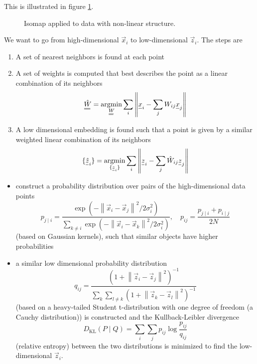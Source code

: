This is illustrated in figure \ref{fig:isomap}.

\begin{figure}[!htb]
    \centering
    
    \caption{Isomap applied to data with non-linear structure.}
    \label{fig:isomap}
\end{figure}

We want to go from high-dimensional $\vec{x}_i$ to low-dimensional $\vec{z}_i$. The steps are
\begin{enumerate}
    \item A set of nearest neighbors is found at each point
    \item A set of weights is computed that best describes the point as a linear combination of its neighbors
    \begin{equation}
        \mat{\hat{W}} = \argmin_\mat{W} \sum_i \norm{\vec{x}_i-\sum_{j}W_{ij}\vec{x}_j}
    \end{equation}
    \item A low dimensional embedding is found such that a point is given by a similar weighted linear combination of its neighbors
    \begin{equation}
        \{ \vec{\hat{z}}_i \} = \argmin_{\{ \vec{z}_i \}} \sum_i \norm{\vec{z}_i-\sum_{j}\hat{W}_{ij}\vec{z}_j}
    \end{equation}
\end{enumerate}

\begin{itemize}
    \item construct a probability distribution over pairs of the high-dimensional data points
    \begin{equation}
        p_{j \mid i}=\frac{\exp \left(-\left\|\vec{x}_i-\vec{x}_j\right\|^2 / 2 \sigma_i^2\right)}{\sum_{k \neq i} \exp \left(-\left\|\vec{x}_i-\vec{x}_k\right\|^2 / 2 \sigma_i^2\right)}, \quad p_{i j}=\frac{p_{j \mid i}+p_{i \mid j}}{2 N}
    \end{equation}
    (based on Gaussian kernels), such that similar objects have higher probabilities
    \item a similar low dimensional probability distribution
    \begin{equation}
        q_{i j}=\frac{\left(1+\left\|\vec{z}_i-\vec{z}_j\right\|^2\right)^{-1}}{\sum_k \sum_{l \neq k}\left(1+\left\|\vec{z}_k-\vec{z}_l\right\|^2\right)^{-1}}
    \end{equation}
    (based on a heavy-tailed Student t-distribution with
    one degree of freedom (a Cauchy distribution)) is constructed
    and the Kullback-Leibler divergence
    \begin{equation}
        D_\text{KL}(P \mid Q)=\sum_{i} \sum_{j} p_{i j} \log \frac{p_{i j}}{q_{i j}}
    \end{equation}
    (relative entropy) between the two distributions is minimized to find the low-dimensional $\vec{z}_i$.
\end{itemize}

